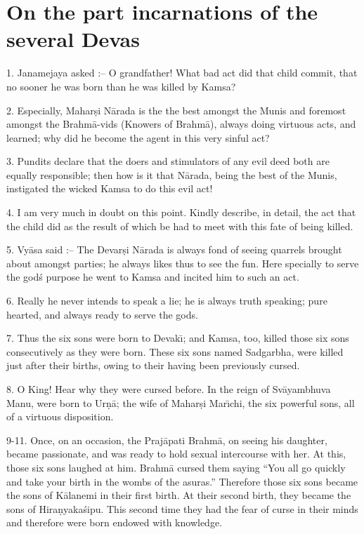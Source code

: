 \chapter{On the part incarnations of the several Devas}

1. Janamejaya asked :-- O grandfather! What bad act did that child commit, that no sooner he was born than he was killed by Kamsa?

2. Especially, Mahar\d{s}i N\=arada is the the best amongst the Munis and foremost amongst the Brahm\=a-vids (Knowers of Brahm\=a), always doing virtuous acts, and learned; why did he become the agent in this very sinful act?

3. Pundits declare that the doers and stimulators of any evil deed both are equally responsible; then how is it that N\=arada, being the best of the Munis, instigated the wicked Kamsa to do this evil act!

4. I am very much in doubt on this point. Kindly describe, in detail, the act that the child did as the result of which be had to meet with this fate of being killed.

5. Vy\=asa said :-- The Devar\d{s}i N\=arada is always fond of seeing quarrels brought about amongst parties; he always likes thus to see the fun. Here specially to serve the god\'s purpose he went to Kamsa and incited him to such an act.

6. Really he never intends to speak a lie; he is always truth speaking; pure hearted, and always ready to serve the gods.

7. Thus the six sons were born to Devak\={\i}; and Kamsa, too, killed those six sons consecutively as they were born. These six sons named Sadgarbha, were killed just after their births, owing to their having been previously cursed.

8. O King! Hear why they were cursed before. In the reign of Sv\=ayambhuva Manu, were born to Ur\d{n}\=a; the wife of Mahar\d{s}i Mar\={\i}chi, the six powerful sons, all of a virtuous disposition.

9-11. Once, on an occasion, the Praj\=apati Brahm\=a, on seeing his daughter, became passionate, and was ready to hold sexual intercourse with her. At this, those six sons laughed at him. Brahm\=a cursed them saying ``You all go quickly and take your birth in the wombs of the asuras.'' Therefore those six sons became the sons of K\=alanemi in their first birth. At their second birth, they became the sons of Hira\d{n}yaka\'sipu. This second time they had the fear of curse in their minds and therefore were born endowed with knowledge.

